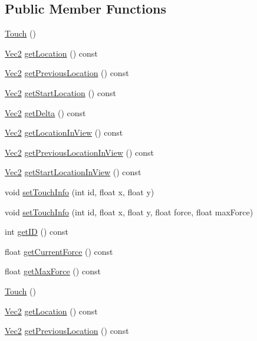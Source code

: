 \subsection*{Public Member Functions}
\begin{DoxyCompactItemize}
\item 
\hyperlink{classTouch_a5de15620894cc276f2c0844fa0507246}{Touch} ()
\item 
\hyperlink{classVec2}{Vec2} \hyperlink{classTouch_af6895993796395892d88534943d7f683}{get\+Location} () const
\item 
\hyperlink{classVec2}{Vec2} \hyperlink{classTouch_a9a03d678c1e9d637bd4b6807fbcd1fa1}{get\+Previous\+Location} () const
\item 
\hyperlink{classVec2}{Vec2} \hyperlink{classTouch_a41f954b7af4bd5ae3af1f78ace3bc4e2}{get\+Start\+Location} () const
\item 
\hyperlink{classVec2}{Vec2} \hyperlink{classTouch_a386d29f52c790a8b5232a1e248390aa7}{get\+Delta} () const
\item 
\hyperlink{classVec2}{Vec2} \hyperlink{classTouch_aaf3ef147c02cc42da2926b85d314c351}{get\+Location\+In\+View} () const
\item 
\hyperlink{classVec2}{Vec2} \hyperlink{classTouch_add6c4fcef98e104067cf833639ac410d}{get\+Previous\+Location\+In\+View} () const
\item 
\hyperlink{classVec2}{Vec2} \hyperlink{classTouch_a9e7c3b29da7fc935b3e894a48f1fc716}{get\+Start\+Location\+In\+View} () const
\item 
void \hyperlink{classTouch_a9168ec4828464fb2b93138d7ea59a605}{set\+Touch\+Info} (int id, float x, float y)
\item 
void \hyperlink{classTouch_a086ff2a5bfdfc1f07bdee7266fb48368}{set\+Touch\+Info} (int id, float x, float y, float force, float max\+Force)
\item 
int \hyperlink{classTouch_a68fe0fa8c82e12d4b718989a3064ebea}{get\+ID} () const
\item 
float \hyperlink{classTouch_a05f094436515098deac33467fcb361d4}{get\+Current\+Force} () const
\item 
float \hyperlink{classTouch_a4aa254ea9e7d9dba69439b295da0ccb0}{get\+Max\+Force} () const
\item 
\hyperlink{classTouch_a5de15620894cc276f2c0844fa0507246}{Touch} ()
\item 
\hyperlink{classVec2}{Vec2} \hyperlink{classTouch_af6895993796395892d88534943d7f683}{get\+Location} () const
\item 
\hyperlink{classVec2}{Vec2} \hyperlink{classTouch_a9a03d678c1e9d637bd4b6807fbcd1fa1}{get\+Previous\+Location} () const

\end{DoxyCompactItemize}
